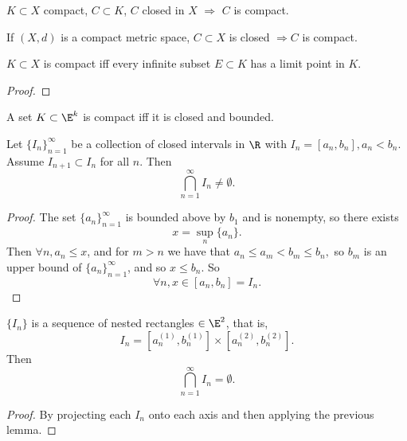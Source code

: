 \documentclass{notes}
\begin{document}
\begin{theorem}
  $K\subset X$ compact, $C\subset K$, $C$ closed in $X$ $\Rightarrow$ $C$ is compact.
\end{theorem}
\begin{corollary}
  If $(X,d)$ is a compact metric space, $C\subset X$ is closed $\Rightarrow C$ is compact.
\end{corollary}
\begin{theorem}
  $K\subset X$ is compact iff every infinite subset $E\subset K$ has a limit point in $K$.
\end{theorem}
\begin{proof}

\end{proof}

\begin{theorem}
  A set $K\subset\E^k$ is compact iff it is closed and bounded.
\end{theorem}

\begin{lemma}
  Let $\{I_n\}_{n=1}^\infty$ be a collection of closed intervals in $\R$ with $I_n = [a_n, b_n],
  a_n < b_n$. Assume $I_{n+1} \subset I_n$ for all $n$. Then $$\bigcap_{n=1}^\infty I_n \neq \emptyset.$$
\end{lemma}
\begin{proof}
  The set $\{a_n\}_{n=1}^\infty$ is bounded above by $b_1$ and is nonempty, so there exists
  $$x = \sup_n \{a_n\}.$$ Then $\forall n, a_n\leq x$, and for $m>n$ we have that
  $a_n \leq a_m < b_m \leq b_n,$ so $b_m$ is an upper bound of $\{a_n\}_{n=1}^\infty$, and so 
  $x\leq b_n$. So $$\forall n, x\in [a_n, b_n] = I_n.$$
\end{proof}

\begin{lemma}
  $\{I_n\}$ is a sequence of nested rectangles $\in\E^2$, that is, $$I_n = [a_n^{(1)}, b_n^{(1)}]
  \times [a_n^{(2)}, b_n^{(2)}].$$ Then $$\bigcap_{n=1}^\infty I_n = \emptyset.$$
\end{lemma}
\begin{proof}
  By projecting each $I_n$ onto each axis and then applying the previous lemma.
\end{proof}
\end{document}
